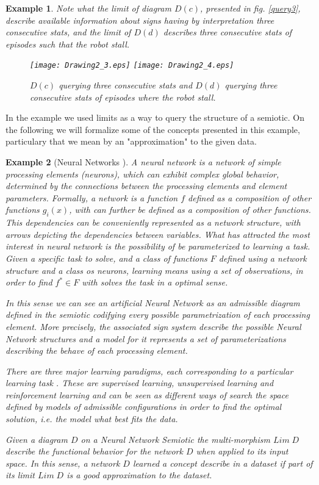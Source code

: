 \documentclass[oribibl]{llncs}
\newtheorem{exam}{Example}
\begin{document}
\begin{exam}
Note what the limit of diagram $D(c)$, presented in fig. \ref{query3}, describe available information about signs having by interpretation three consecutive stats, and the limit of $D(d)$ describes three consecutive stats of episodes such that the robot stall.

\begin{figure}[h]
    \begin{center}
    \texttt{[image: Drawing2\_3.eps]}
    \texttt{[image: Drawing2\_4.eps]}
    \end{center}
    \caption{$D(c)$ querying three consecutive stats and $D(d)$ querying three consecutive stats of episodes where the robot stall.}\label{query4}
\end{figure}
\end{exam}

In the example we used limits as a way to query the structure of a semiotic. On the following we will formalize some of the concepts presented in this example, particulary that we mean by an "approximation" to the given data.

\begin{exam}[Neural Networks \cite{Michell86}]
A neural network is a network of simple processing elements (neurons), which can exhibit complex global behavior, determined by the connections between the processing elements and element parameters.  Formally, a network is a function $f$ defined as a composition of other functions $g_i(x)$, with can further be defined as a composition of other functions. This dependencies can be conveniently represented as a network structure, with arrows depicting the dependencies between variables. What has attracted the most interest in neural network is the possibility of be parameterized to learning a task. Given a specific task to solve, and a class of functions $F$ defined using a network structure and a class os neurons, learning means using a set of observations, in order to find $f^\ast\in F$ with solves the task in a optimal sense.

In this sense we can see an artificial Neural Network as an admissible diagram defined in the semiotic codifying  every possible parametrization of each processing element. More precisely, the associated sign system describe the possible Neural Network structures and a model for it represents a set of parameterizations describing the behave of each processing element.

There are three major learning paradigms, each corresponding to a particular learning task \cite{Bishop96}. These are supervised learning, unsupervised learning and reinforcement learning and can be seen as different ways of search the space defined by models of admissible configurations in order to find the optimal solution, i.e. the model what best fits the data.

Given a diagram $D$ on a Neural Network Semiotic the multi-morphism $Lim\;D$ describe the functional behavior for the network $D$ when applied to its input space. In this sense, a network $D$ learned a concept describe in a dataset if part of its limit $Lim\;D$ is a good approximation to the dataset.
\end{exam}
\end{document}
